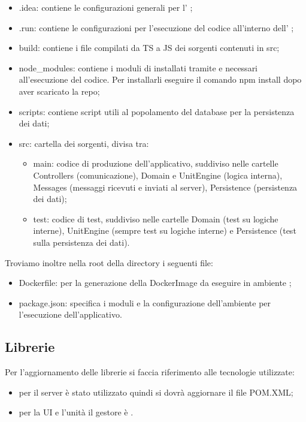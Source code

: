 	\begin{itemize}
		\item{.idea}: contiene le configurazioni generali per l' ;
		\item{.run}: contiene le configurazioni per l'esecuzione del codice all'interno dell' ;
		\item{build}: contiene i file compilati da TS a JS dei sorgenti contenuti in src;
		\item{node\_modules}: contiene i moduli di  installati tramite  e necessari all'esecuzione del codice. Per installarli eseguire il comando npm install dopo aver scaricato la repo;
		\item{scripts}: contiene script utili al popolamento del database per la persistenza dei dati;
		\item{src}: cartella dei sorgenti, divisa tra:
		\begin{itemize}
			\item{main}: codice di produzione dell'applicativo, suddiviso nelle cartelle Controllers (comunicazione), Domain e UnitEngine (logica interna), Messages (messaggi ricevuti e inviati al server), Persistence (persistenza dei dati);
			\item{test}: codice di test, suddiviso nelle cartelle Domain (test su logiche interne),	UnitEngine (sempre test su logiche interne) e Persistence (test sulla persistenza dei dati).
		\end{itemize}
	\end{itemize}
	
	Troviamo inoltre nella root della directory i seguenti file:
	\begin{itemize}
		\item{Dockerfile}: per la generazione della DockerImage da eseguire in ambiente ;
		\item{package.json}: specifica i moduli e la configurazione dell'ambiente  per l'esecuzione dell'applicativo.
	\end{itemize}
	
\subsection{Librerie}
	Per l'aggiornamento delle librerie si faccia riferimento alle tecnologie utilizzate:
	\begin{itemize}
		\item{} per il server è stato utilizzato  quindi si dovrà aggiornare il file POM.XML;
		\item{} per la UI e l'unità il gestore è .
	\end{itemize}
